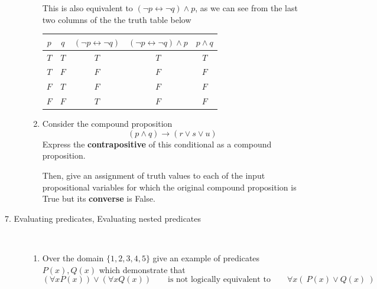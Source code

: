 \begin{description}
\begin{enumerate}
{This is also equivalent to  $(\neg p \leftrightarrow \neg q) \wedge p$, as we can see from
the last two columns of the the truth 
table below

\begin{center}
\begin{tabular}{cc||c|c|c}
$p$ & $q$ & $(\neg p \leftrightarrow \neg q)$ & $(\neg p \leftrightarrow \neg q) \land p$ & $p \land q$ \\
\hline
$T$ & $T$ & $T$ & $T$ & $T$ \\
$T$ & $F$ & $F$ & $F$ & $F$ \\
$F$ & $T$ & $F$ & $F$ & $F$ \\
$F$ & $F$ & $T$ & $F$ & $F$ \\
\end{tabular}
\end{center}
}
\else{}
\fi

\item Consider the compound proposition 
\[
(p \wedge q) \to (r \vee s \vee u)
\]
Express the {\bf contrapositive} of this conditional as a compound proposition.

Then, give an assignment of truth values to each of the input propositional variables
for which the original compound proposition is True but its {\bf converse} is False.

\ifsolution
{}
\else{}
\fi
\end{enumerate}


\item[7. Evaluating predicates, Evaluating nested predicates] \qquad \\
\begin{enumerate}%
\item Over the domain $\{ 1,2,3,4,5\}$ give an example of predicates $P(x), Q(x)$
which demonstrate that 
\[
(\forall x P(x)) \vee (\forall x Q(x))
\qquad \text{is not logically equivalent to} \qquad 
 \forall x  (~ P(x) \vee Q(x) ~)
\]


\end{enumerate}
\end{description}
